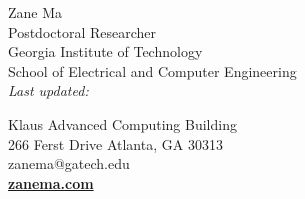 \documentclass[10pt,singlecolumn]{article} %
\def\parsedate #1:20#2#3#4#5#6#7#8\empty{20#2#3/#4#5/#6#7}
\def\moddate#1{\expandafter\parsedate\pdffilemoddate{#1}\empty}
\begin{document}
\color{text1} %

\begin{minipage}[t]{0.5\textwidth}
{\Huge Zane Ma} \vspace{0.5cm}\\ %
Postdoctoral Researcher \\
Georgia Institute of Technology \\
School of Electrical and Computer Engineering \\
\emph{Last updated: \moddate{\jobname.tex}}

\end{minipage}
\begin{minipage}[t]{0.5\textwidth}
\begin{flushright}
\vspace{\baselineskip}
Klaus Advanced Computing Building \\
266 Ferst Drive Atlanta, GA 30313 \\
zanema@gatech.edu \\ 
\textbf{\href{https://zanema.com}{zanema.com}}
\end{flushright}
\end{minipage}





	 
\end{document}
